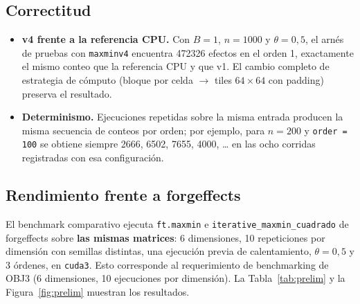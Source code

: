 \documentclass[11pt,a4paper]{article}
\begin{document}
\subsection{Correctitud}
\begin{itemize}
  \item \textbf{v4 frente a la referencia CPU.} Con $B=1$, $n=\num{1000}$ y $\theta=0{,}5$,
        el arnés de pruebas con \texttt{maxminv4} encuentra \num{472326} efectos en el orden 1,
        exactamente el mismo conteo que la referencia CPU y que v1. El cambio completo de
        estrategia de cómputo (bloque por celda $\rightarrow$ tiles $64\times64$ con padding)
        preserva el resultado.
  \item \textbf{Determinismo.} Ejecuciones repetidas sobre la misma entrada producen la misma
        secuencia de conteos por orden; por ejemplo, para $n=200$ y \texttt{order = 100} se
        obtiene siempre \num{2666}, \num{6502}, \num{7655}, \num{4000}, \ldots{} en las ocho
        corridas registradas con esa configuración.
\end{itemize}

\subsection{Rendimiento frente a forgeffects}
El benchmark comparativo ejecuta \texttt{ft.maxmin} e
\texttt{iterative\_maxmin\_\allowbreak cuadrado} de forgeffects sobre \textbf{las mismas matrices}: 6
dimensiones, 10 repeticiones por dimensión con semillas distintas, una ejecución previa de
calentamiento, $\theta=0{,}5$ y 3 órdenes, en \texttt{cuda3}. Esto corresponde al requerimiento
de benchmarking de OBJ3 (6 dimensiones, 10 ejecuciones por dimensión). La Tabla~\ref{tab:prelim}
y la Figura~\ref{fig:prelim} muestran los resultados.
\end{document}
